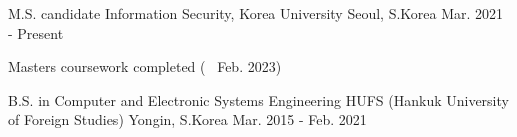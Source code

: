 

\begin{cventries}
  \cventry
    {M.S. candidate} %
    {Information Security, Korea University} %
    {Seoul, S.Korea} %
    {Mar. 2021 - Present} %
    {
      \begin{cvitems} %
        \item {Masters coursework completed (~ Feb. 2023)}
      \end{cvitems}
    }

  \cventry
    {B.S. in Computer and Electronic Systems Engineering} %
    {HUFS (Hankuk University of Foreign Studies)} %
    {Yongin, S.Korea} %
    {Mar. 2015 - Feb. 2021} %
    {
    }

\end{cventries}
